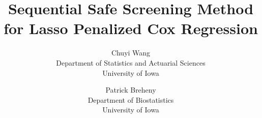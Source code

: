 \documentclass{article}
\title{Sequential Safe Screening Method for Lasso Penalized Cox Regression}
\author{Chuyi Wang\\Department of Statistics and Actuarial Sciences\\University of Iowa
  \and
  Patrick Breheny\\Department of Biostatistics\\University of Iowa}
\date{}
\begin{document}
\maketitle

\begin{abstract}
\end{abstract}




\end{document}
